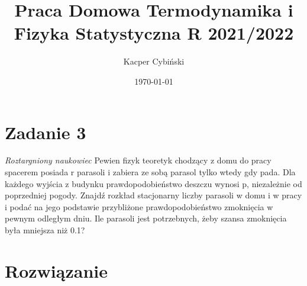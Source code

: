 \documentclass[12pt,a4paper]{article}
\title{Praca Domowa Termodynamika i Fizyka Statystyczna R 2021/2022}
\author{Kacper Cybiński}
\date{\today}
\begin{document}
\maketitle

\section{Zadanie 3}



\textit{Roztargniony naukowiec} 
Pewien fizyk teoretyk chodzący z domu do pracy spacerem posiada r parasoli i zabiera ze sobą parasol tylko wtedy gdy pada. Dla każdego wyjścia z budynku prawdopodobieństwo deszczu wynosi p, niezależnie od poprzedniej pogody. Znajdź rozkład stacjonarny liczby parasoli w domu i w pracy i podać na jego podstawie przybliżone prawdopodobieństwo zmoknięcia w pewnym odległym dniu. Ile parasoli jest potrzebnych, żeby szansa zmoknięcia była mniejsza niż 0.1?



\section{Rozwiązanie}
\end{document}
